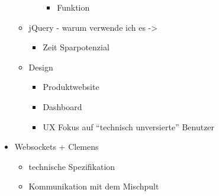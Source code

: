 \begin{itemize}
\begin{itemize}
\begin{itemize}
      \begin{itemize}
      \tightlist
      \item
        Funktion
      \end{itemize}
    \end{itemize}
  \item
    jQuery - warum verwende ich es -\textgreater{}

    \begin{itemize}
    \tightlist
    \item
      Zeit Sparpotenzial
    \end{itemize}
  \item
    Design

    \begin{itemize}
    \tightlist
    \item
      Produktwebsite
    \item
      Dashboard
    \item
      UX Fokus auf ``technisch unversierte'' Benutzer
    \end{itemize}
  \end{itemize}
\item
  Websockets + Clemens

  \begin{itemize}
  \tightlist
  \item
    technische Spezifikation
  \item
    Kommunikation mit dem Mischpult
  \end{itemize}
\end{itemize}
